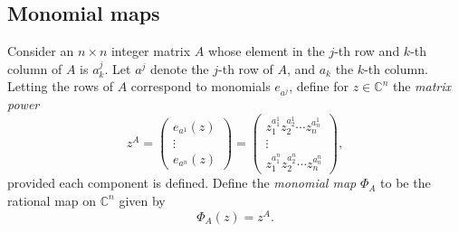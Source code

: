 \documentclass[letterpaper,11pt,reqno]{amsart}
\theoremstyle{plain}
\theoremstyle{definition}
\theoremstyle{remark}
\theoremstyle{remark}
\numberwithin{equation}{section}
\newcommand{\C}{{\mathbb C}}
\begin{document}
  
\subsection{Monomial maps}\label{SS:MonomialMaps}

Consider an $n\times n$ integer matrix $A$ whose element in the $j$-th row and $k$-th column of $A$ is $a_k^j$. 
Let $a^j$ denote the $j$-th row of $A$, and $a_k$ the $k$-th column. 
Letting the rows of $A$ correspond to monomials $e_{a^j}$, define for $z\in \C^n$ the {\em matrix power}
\begin{equation}\label{eq-matrixpower}
z^A = \begin{pmatrix}
e_{a^1}(z)\\\vdots\\ e_{a^n}(z)
\end{pmatrix}
= \begin{pmatrix}
z_1^{a^1_1}z_2^{a^1_2}\cdots z_n^{a^1_n}\\\vdots\\ z_1^{a^n_1}z_2^{a^n_2}\cdots z_n^{a^n_n}
\end{pmatrix},
\end{equation}
provided each component is defined. 
Define the {\em monomial map} $\Phi_A$ to be the rational map on $\C^n$ given by
\begin{equation}\label{D:monomial-map}
    \Phi_A(z) = z^A.
\end{equation} 
\end{document}
